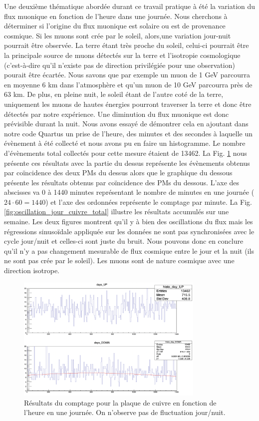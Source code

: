 \documentclass[12pt]{article}
\begin{document}
Une deuxième thématique abordée durant ce travail pratique à été la variation du flux muonique en fonction de l'heure dans une journée. Nous cherchons à déterminer si l'origine du flux muonique est solaire ou est de provenance cosmique. Si les muons sont crée par le soleil, alors,une variation jour-nuit pourrait être observée. 
La terre étant très proche du soleil, celui-ci pourrait être la principale source de muons détectés sur la terre et l'isotropie cosmologique (c'est-à-dire qu'il n'existe pas de direction privilégiée pour une observation) pourait être écartée.
Nous savons que par exemple un muon de 1 GeV parcourra en moyenne 6 km dans l'atmosphère et qu'un muon de 10 GeV parcourra près de 63 km. De plus, en pleine nuit, le soleil étant de l'autre coté de la terre, uniquement les muons de hautes énergies pourront traverser la terre et donc être détectés par notre expérience. Une diminution du flux muonique est donc prévisible durant la nuit. Nous avons essayé de démontrer cela en ajoutant dans notre code Quartus un prise de l'heure, des minutes et  des secondes à laquelle un évènement à été collecté et nous avons pu en faire un histogramme. Le nombre d'évènements total collectés pour cette mesure étaient de 13462. La Fig. \ref{fig:oscillation_jour_cuivre} nous présente ces résultats avec la partie du dessus représente les évènements obtenus par coïncidence des deux PMs du dessus alors que le graphique du dessous présente les résultats obtenus par coïncidence des PMs du dessous. L'axe des abscisses va 0 à 1440 minutes représentant le nombre de minutes en une journée ($24\cdot60=1440$) et l'axe des ordonnées représente le comptage par minute. La Fig. \ref{fig:oscillation_jour_cuivre_total} illustre les résultats accumulés sur une semaine. Les deux figures montrent qu'il y à bien des oscillations du flux mais les régressions sinusoïdale appliquée sur les données ne sont pas synchronisées avec le cycle jour/nuit et celles-ci sont juste du bruit.  Nous pouvons donc en conclure qu'il n'y a pas changement mesurable de flux cosmique entre le jour et la nuit (ils ne sont pas crée par le soleil). Les muons sont de nature cosmique avec une direction isotrope.

\begin{figure}[htpb!]
    \centering
    \includegraphics[width=0.8\textwidth]{graphiques/experience1/cuivre/OSCILLATION_JOUR_CUIVRE.png}
    \caption{Résultats du comptage pour la plaque de cuivre en fonction de l'heure en une journée. On n'observe pas de fluctuation jour/nuit.}
    \label{fig:oscillation_jour_cuivre}
\end{figure}
\end{document}
